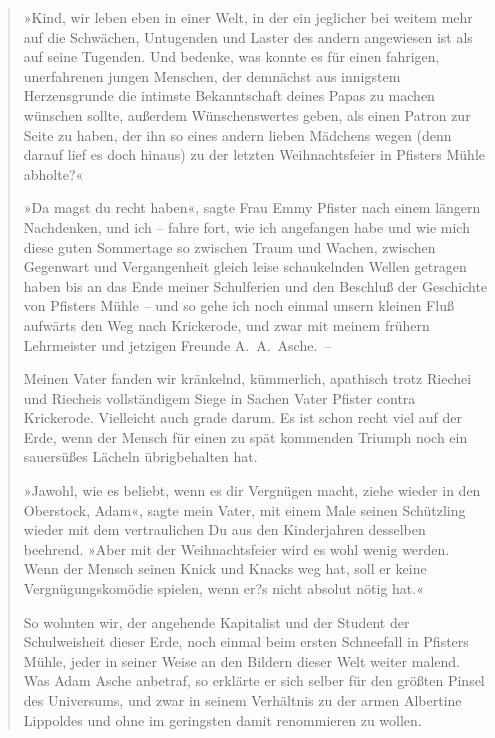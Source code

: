\begin{verse}
»Kind, wir leben eben in einer Welt, in der ein jeglicher bei
weitem mehr auf die Schwächen, Untugenden und Laster des andern
angewiesen ist als auf seine Tugenden. Und bedenke, was konnte es
für einen fahrigen, unerfahrenen jungen Menschen, der demnächst aus
innigstem Herzensgrunde die intimste Bekanntschaft deines Papas zu
machen wünschen sollte, außerdem Wünschenswertes geben, als einen
Patron zur Seite zu haben, der ihn so eines andern lieben Mädchens
wegen (denn darauf lief es doch hinaus) zu der letzten
Weihnachtsfeier in Pfisters Mühle abholte?«

»Da magst du recht haben«, sagte Frau Emmy Pfister nach einem
längern Nachdenken, und ich – fahre fort, wie ich angefangen habe
und wie mich diese guten Sommertage so zwischen Traum und Wachen,
zwischen Gegenwart und Vergangenheit gleich leise schaukelnden
Wellen getragen haben bis an das Ende meiner Schulferien und den
Beschluß der Geschichte von Pfisters Mühle – und so gehe ich noch
einmal unsern kleinen Fluß aufwärts den Weg nach Krickerode, und
zwar mit meinem frühern Lehrmeister und jetzigen Freunde
A.~A.~Asche.~–

Meinen Vater fanden wir kränkelnd, kümmerlich, apathisch trotz
Riechei und Riecheis vollständigem Siege in Sachen Vater Pfister
contra Krickerode. Vielleicht auch grade darum. Es ist schon recht
viel auf der Erde, wenn der Mensch für einen zu spät kommenden
Triumph noch ein sauersüßes Lächeln übrigbehalten hat.

»Jawohl, wie es beliebt, wenn es dir Vergnügen macht, ziehe wieder
in den Oberstock, Adam«, sagte mein Vater, mit einem Male seinen
Schützling wieder mit dem vertraulichen Du aus den Kinderjahren
desselben beehrend. »Aber mit der Weihnachtsfeier wird es wohl
wenig werden. Wenn der Mensch seinen Knick und Knacks weg hat, soll
er keine Vergnügungskomödie spielen, wenn er?s nicht absolut nötig
hat.«

So wohnten wir, der angehende Kapitalist und der Student der
Schulweisheit dieser Erde, noch einmal beim ersten Schneefall in
Pfisters Mühle, jeder in seiner Weise an den Bildern dieser Welt
weiter malend. Was Adam Asche anbetraf, so erklärte er sich selber
für den größten Pinsel des Universums, und zwar in seinem
Verhältnis zu der armen Albertine Lippoldes und ohne im geringsten
damit renommieren zu wollen.


\end{verse}
